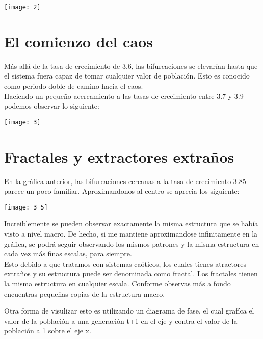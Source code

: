 \documentclass[12pt]{article}
\begin{document}
\begin{center}
\texttt{[image: 2]}
\end{center}



\newpage
\section*{El comienzo del caos}

Más allá de la tasa de crecimiento de 3.6, las bifurcaciones se elevarían hasta que el sistema fuera capaz de tomar cualquier valor de población. Esto es conocido como periodo doble de camino hacia el caos. \\

Haciendo un pequeño acercamiento a las tasas de crecimiento entre 3.7 y 3.9 podemos observar lo siguiente:

\begin{center}
\texttt{[image: 3]}
\end{center}

\newpage
\section*{Fractales y extractores extraños}
En la gráfica anterior, las bifurcaciones cercanas a la tasa de crecimiento 3.85 parece un poco familiar. Aproximandonos al centro se aprecia los siguiente: 

\begin{center}
\texttt{[image: 3\_5]}
\end{center}

Increiblemente se pueden observar exactamente la misma estructura que se había visto a nivel macro. De hecho, si me mantiene aproximandose infinitamente en la gráfica, se podrá seguir observando los mismos patrones y la misma estructura en cada vez más finas escalas, para siempre.\\

Esto debido a que tratamos con sistemas caóticos, los cuales tienes atractores extraños y su estructura puede ser denominada como fractal. Los fractales tienen la misma estructura en cualquier escala. Conforme observas más a fondo encuentras pequeñas copias de la estructura macro.

\newpage
Otra forma de visulizar esto es utilizando un diagrama de fase, el cual grafíca el valor de la población a una generación t+1 en el eje y contra el valor de la población a 1 sobre el eje x.
\end{document}
